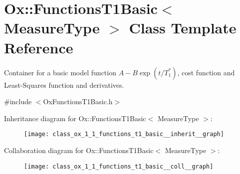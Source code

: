 \hypertarget{class_ox_1_1_functions_t1_basic}{\section{Ox\-:\-:Functions\-T1\-Basic$<$ Measure\-Type $>$ Class Template Reference}
\label{class_ox_1_1_functions_t1_basic}
}


Container for a basic model function $ A-B\exp(t/T_1^*) $, cost function and Least-\/\-Squares function and derivatives.  




{\ttfamily \#include $<$Ox\-Functions\-T1\-Basic.\-h$>$}



Inheritance diagram for Ox\-:\-:Functions\-T1\-Basic$<$ Measure\-Type $>$\-:
\nopagebreak
\begin{figure}[H]
\begin{center}
\leavevmode
\texttt{[image: class\_ox\_1\_1\_functions\_t1\_basic\_\_inherit\_\_graph]}
\end{center}
\end{figure}


Collaboration diagram for Ox\-:\-:Functions\-T1\-Basic$<$ Measure\-Type $>$\-:
\nopagebreak
\begin{figure}[H]
\begin{center}
\leavevmode
\texttt{[image: class\_ox\_1\_1\_functions\_t1\_basic\_\_coll\_\_graph]}
\end{center}
\end{figure}
